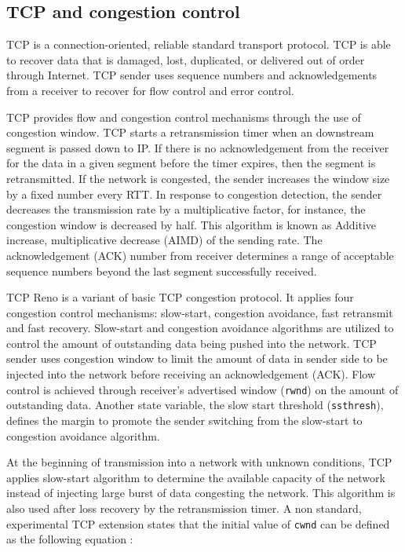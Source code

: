 \documentclass[conference,a4paper]{IEEEtran}
\begin{document}
\subsection{TCP and congestion control}

TCP \cite{tcp} is a connection-oriented, reliable standard transport protocol. TCP is able to recover data that is damaged, lost, duplicated, or delivered out of order through Internet. TCP sender uses sequence numbers and acknowledgements from a receiver to recover for flow control and error control.

TCP provides flow and congestion control mechanisms through the use of congestion window. TCP starts a retransmission timer when an downstream segment is passed down to IP. If there is no acknowledgement from the receiver for the data in a given segment before the timer expires, then the segment is retransmitted. If the network is congested, the sender increases the window size by a fixed number every RTT. In response to congestion detection, the sender decreases the transmission rate by a multiplicative factor, for instance, the congestion window is decreased by half. This algorithm is known as Additive increase, multiplicative decrease (AIMD) of the sending rate. The acknowledgement (ACK) number from receiver determines a range of acceptable sequence numbers beyond the last segment successfully received. 


TCP Reno is a variant of basic TCP congestion protocol. It applies four congestion control mechanisms: slow-start, congestion avoidance, fast retransmit and fast recovery. Slow-start and congestion avoidance algorithms are utilized to control the amount of outstanding data being pushed into the network. TCP sender uses congestion window to limit the amount of data in sender side to be injected into the network before receiving an acknowledgement (ACK). Flow control is achieved through receiver's advertised window (\texttt{rwnd}) on the amount of outstanding data. Another state variable, the slow start threshold (\texttt{ssthresh}), defines the margin to promote the sender switching from the slow-start to congestion avoidance algorithm.

At the beginning of transmission into a network with unknown conditions, TCP applies slow-start algorithm to determine the available capacity of the network instead of injecting large burst of data congesting the network. This algorithm is also used after loss recovery by the retransmission timer. A non standard, experimental TCP extension states that the initial value of \texttt{cwnd} can be defined as the following equation \cite{RFC2414}:
\end{document}
